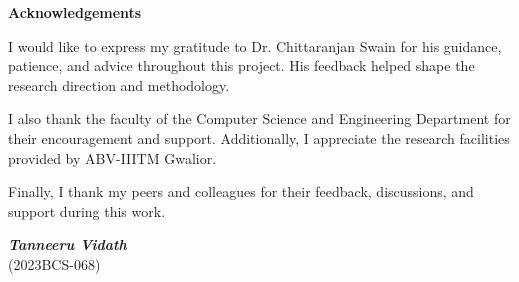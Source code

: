\begin{center}
{\LARGE \bf Acknowledgements}
\end{center}
\noindent I would like to express my gratitude to Dr. Chittaranjan Swain for his guidance, patience, and advice throughout this project. His feedback helped shape the research direction and methodology.

\noindent I also thank the faculty of the Computer Science and Engineering Department for their encouragement and support. Additionally, I appreciate the research facilities provided by ABV-IIITM Gwalior.

\noindent Finally, I thank my peers and colleagues for their feedback, discussions, and support during this work.
\begin{flushright}
\textit{\textbf{Tanneeru Vidath}} \\
(2023BCS-068)
\end{flushright}

